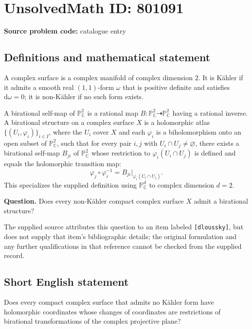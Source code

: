 \documentclass[11pt]{article}
\newcommand{\C}{\mathbb{C}}
\begin{document}
\section*{UnsolvedMath ID: 801091}
\textbf{Source problem code:} catalogue entry
\subsection{Definitions and mathematical statement}
A complex surface is a complex manifold of complex dimension \(2\). It is K\"ahler if it admits a smooth real \((1,1)\)-form \(\omega\) that is positive definite and satisfies \(\mathrm{d}\omega=0\); it is non-K\"ahler if no such form exists.

A birational self-map of \(\mathbb{P}^{2}_{\C}\) is a rational map \(B\colon\mathbb{P}^{2}_{\C}\dashrightarrow\mathbb{P}^{2}_{\C}\) having a rational inverse. A birational structure on a complex surface \(X\) is a holomorphic atlas \(\{(U_i,\varphi_i)\}_{i\in I}\), where the \(U_i\) cover \(X\) and each \(\varphi_i\) is a biholomorphism onto an open subset of \(\mathbb{P}^{2}_{\C}\), such that for every pair \(i,j\) with \(U_i\cap U_j\ne\varnothing\), there exists a birational self-map \(B_{ji}\) of \(\mathbb{P}^{2}_{\C}\) whose restriction to \(\varphi_i(U_i\cap U_j)\) is defined and equals the holomorphic transition map:
\[
\varphi_j\circ\varphi_i^{-1}
= B_{ji}\big|_{\varphi_i(U_i\cap U_j)}.
\]
This specializes the supplied definition using \(\mathbb{P}^{d}_{\C}\) to complex dimension \(d=2\).

\textbf{Question.} Does every non-K\"ahler compact complex surface \(X\) admit a birational structure?

The supplied source attributes this question to an item labeled \texttt{[dloussky]}, but does not supply that item's bibliographic details; the original formulation and any further qualifications in that reference cannot be checked from the supplied record.
\subsection{Short English statement}
Does every compact complex surface that admits no K\"ahler form have holomorphic coordinates whose changes of coordinates are restrictions of birational transformations of the complex projective plane?
\end{document}
